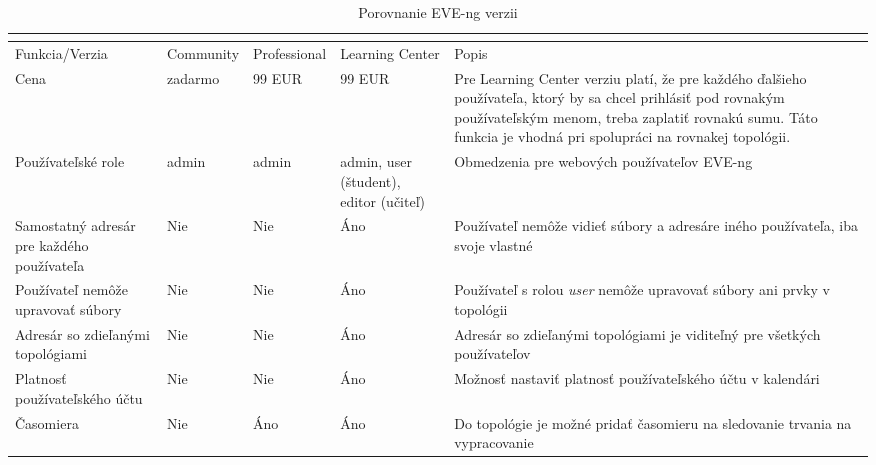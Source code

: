 \begin{longtable}{| m{3cm} | m{2cm} | m{2cm} | m{2cm} | m{4cm} |}
\caption{Porovnanie EVE-ng verzii}
\cite{eve_ng_versions_table}
\label{tab:eve_ng_versions} \\
\hline
Funkcia/Verzia                                      & Community         & Professional    & Learning Center      & Popis                                                                                                   \\ \hline
Cena                                                 & zadarmo              & 99 EUR  & 99 EUR & Pre Learning Center verziu platí, že pre každého ďalšieho používateľa, ktorý by sa chcel prihlásiť pod rovnakým používateľským menom, treba zaplatiť rovnakú sumu. Táto funkcia je vhodná pri spolupráci na rovnakej topológii.
\\ \hline
Používateľské role                                          & admin        & admin      & admin, user (študent), editor (učiteľ)  & Obmedzenia pre webových používateľov EVE-ng \\ \hline
Samostatný adresár pre každého používateľa                                  & Nie                & Nie              & Áno                  & Používateľ nemôže vidieť súbory a adresáre iného používateľa, iba svoje vlastné \\ \hline
Používateľ nemôže upravovať súbory                                 & Nie                & Nie              & Áno                  & Používateľ s rolou \emph{user} nemôže upravovať súbory ani prvky v topológii                                                                             \\ \hline
Adresár so zdieľanými topológiami                                     & Nie                & Nie              & Áno                  & Adresár so zdieľanými topológiami je viditeľný pre všetkých používateľov                                                                       \\ \hline
Platnosť používateľského účtu         & Nie                & Nie              & Áno                  & Možnosť nastaviť platnosť používateľského účtu v kalendári                         \\ \hline
Časomiera                                             & Nie                & Áno             & Áno                  & Do topológie je možné pridať časomieru na sledovanie trvania na vypracovanie                                                                                          \\ \hline

\end{longtable}
